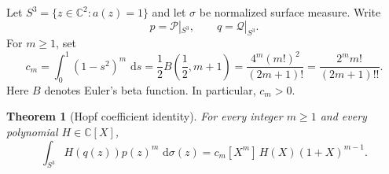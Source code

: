 \documentclass[11pt]{article}
\numberwithin{equation}{section}
\newtheorem{theorem}{Theorem}[section]
\newcommand{\C}{\mathbb C}
\newcommand{\dd}{\,\mathrm d}
\begin{document}
Let $S^3=\{z\in\C^2:a(z)=1\}$ and let $\sigma$ be normalized surface measure.
Write
\[
 p=\mathscr P|_{S^3},
 \qquad
 q=\mathscr Q|_{S^3}.
\]
For $m\geq1$, set
\begin{equation}\label{eq:cm-definition}
 c_m=\int_0^1(1-s^2)^m\,\dd s
 =\frac12 B\!\left(\frac12,m+1\right)
 =\frac{4^m(m!)^2}{(2m+1)!}
 =\frac{2^m m!}{(2m+1)!!}.
\end{equation}
Here $B$ denotes Euler's beta function.  In particular, $c_m>0$.

\begin{theorem}[Hopf coefficient identity]\label{thm:hopf-coefficient}
For every integer $m\geq1$ and every polynomial $H\in\C[X]$,
\begin{equation}\label{eq:hopf-coefficient}
 \int_{S^3}H(q(z))p(z)^m\,\dd\sigma(z)
 =c_m[X^m]\,H(X)(1+X)^{m-1}.
\end{equation}
\end{theorem}
\end{document}
